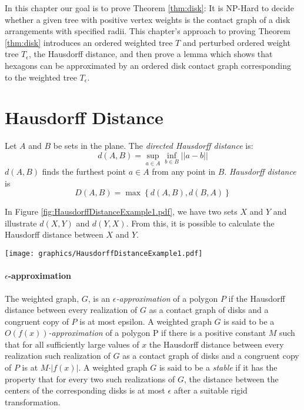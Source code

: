 \documentclass[10pt]{CSUNthesis}
\theoremstyle{plain}%
\theoremstyle{definition}
\theoremstyle{remark}
\newcommand{\lr}[1]{\left( #1 \right)}
\newcommand{\BigOh}[1]{O\left( #1 \right)}
\begin{document}
In this chapter our goal is to prove Theorem \ref{thm:disk}: It is NP-Hard to decide whether a given tree with positive vertex weights is the contact graph of a disk arrangements with specified radii.   
This chapter's approach to proving Theorem \ref{thm:disk} introduces an ordered weighted tree $T$ and perturbed ordered weight tree $T_\epsilon$, the Hausdorff distance, and then prove a lemma which shows that hexagons can be approximated by an ordered disk contact graph corresponding to the weighted tree $T_\epsilon$.

\section{Hausdorff Distance}  
Let $A$ and $B$ be sets in the plane. The \textit{directed Hausdorff distance} is: 
\begin{equation}\label{eqn:ContactGraphV3-1}
d\lr{A,B} = \sup_{a \in A} \inf_{b \in B} \left\vert\left\vert a-b \right\vert \right\vert
\end{equation}
$d\lr{A,B}$ finds the furthest point $a \in A$ from any point in $B$.  \textit{Hausdorff distance} is
\begin{equation}\label{eqn:ContactGraphV3-2}
D\lr{A,B} = \max \left\lbrace d\lr{A,B}, d\lr{B,A} \right\rbrace
\end{equation}

In Figure \ref{fig:HausdorffDistanceExample1.pdf}, we have two sets $X$ and $Y$ and illustrate $d(X,Y)$ and $d(Y,X)$.  
From this, it is possible to calculate the Hausdorff distance between $X$ and $Y$.

\begin{minipage}{\linewidth}
\begin{center}
\texttt{[image: graphics/HausdorffDistanceExample1.pdf]}
\label{fig:HausdorffDistanceExample1.pdf}
\end{center}
\end{minipage}

\paragraph{$\epsilon$-approximation}
The weighted graph, $G$, is an \textit{$\epsilon$-approximation} of a polygon $P$ if the Hausdorff distance between every realization of $G$ as a contact graph of disks and a congruent copy of $P$ is at most epsilon.  
A weighted graph $G$ is said to be a \textit{$\BigOh{f(x)}$-approximation} of a polygon P if there is a positive constant $M$ such that for all sufficiently large values of $x$ the Hausdorff distance between every realization such realization of $G$ as a contact graph of disks and a congruent copy of $P$ is at $M \cdot \vert f(x)\vert$. 
A weighted graph $G$ is said to be a \textit{stable} if it has the property that for every two such realizations of $G$, the distance between the centers of the corresponding disks is at most $\epsilon$ after a suitable rigid transformation.
\end{document}
